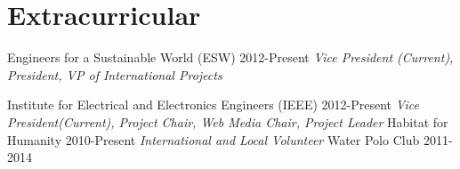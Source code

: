 \documentclass[]{friggeri-cv} %
\begin{document}
\section{Extracurricular}

\begin{entrylist}
\entryFourItem
{Engineers for a Sustainable World (ESW)}
{2012-Present}
{}
{\emph{Vice President (Current), President, VP of International Projects}}

\entryFourItem
{Institute for Electrical and Electronics Engineers  (IEEE)}
{2012-Present}
{}
{\emph{Vice President(Current), Project Chair, Web Media Chair, Project Leader}}
\entryFourItem
{Habitat for Humanity}
{2010-Present}
{}
{\emph{International and Local Volunteer}}
\entryFourItem
{Water Polo Club}
{2011-2014}
{}
{\emph{}}

\end{entrylist}
\end{document}
